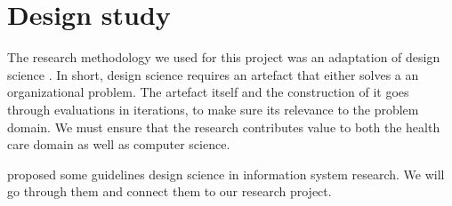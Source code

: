 

\section{Design study}
The research methodology we used for this project was an adaptation of design science \parencite{Hevner2004}.  In short, design science requires an artefact that either solves a an organizational problem. The artefact itself and the construction of it goes through evaluations in iterations, to make sure its relevance to the problem domain. We must ensure that the research contributes value to both the health care domain as well as computer science.

\textcite{Hevner2004} proposed some guidelines design science in information system research. We will go through them and connect them to our research project.

